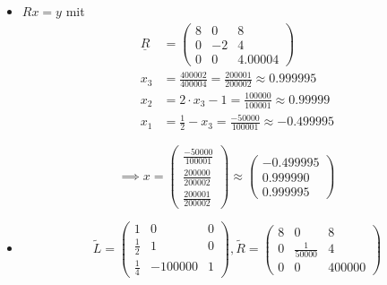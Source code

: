\documentclass[12pt]{scrartcl}
\begin{document}
\begin{enumAlph}
\begin{itemize}
    \item[II.] $Rx=y$ mit
        \[
        \begin{aligned}
        \underline{R} &= \begin{pmatrix}
            8 & 0 & 8 \\
            0 & -2 & 4 \\
            0 & 0 & 4.00004
        \end{pmatrix}
        \\[6pt]
        x_3 &= \frac{400002}{400004}=\frac{200001}{200002}\approx 0.999995 \\
        x_2 &= 2\cdot x_3 -1= \frac{100000}{100001}\approx 0.99999\\
        x_1 &= \frac{1}{2}-x_3=\frac{-50000}{100001}\approx -0.499995
        \end{aligned}
        \]

    
    \end{itemize}

        \[
            \implies x=\begin{pmatrix}
                \frac{-50000}{100001} \\[6pt] \frac{200000}{200002} \\[6pt] \frac{200001}{200002}
                    \end{pmatrix}\approx \begin{pmatrix}
                        -0.499995 \\ 0.999990 \\ 0.999995
                    \end{pmatrix}
        \]

\newpage
\item \leavevmode
\begin{itemize}

    \item[I.]  \leavevmode
    \[
    \tilde{L}=\begin{pmatrix}
      1 & 0 & 0 \\
      \frac{1}{2} & 1 & 0 \\
      \frac{1}{4} & -100 000 & 1
    \end{pmatrix}, \tilde{R}=\begin{pmatrix}
        8 & 0 & 8 \\
            0 & \frac{1}{50000} & 4 \\
            0 & 0 & 400000
    \end{pmatrix}
    \]
    

\end{itemize}
\end{enumAlph}
\end{document}
